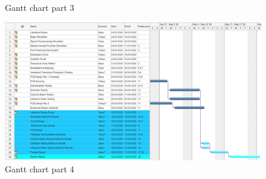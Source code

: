 \begin{appendices}
\begin{figure}[h]
    \caption{Gantt chart part 3}
    \label{fig:gantt3}
\end{figure}
\begin{figure}[h]
    \centering
    \includegraphics[width=\textwidth]{Figures/Gantt4.PNG}
    \caption{Gantt chart part 4}
    \label{fig:gantt4}
\end{figure}

\end{appendices}
